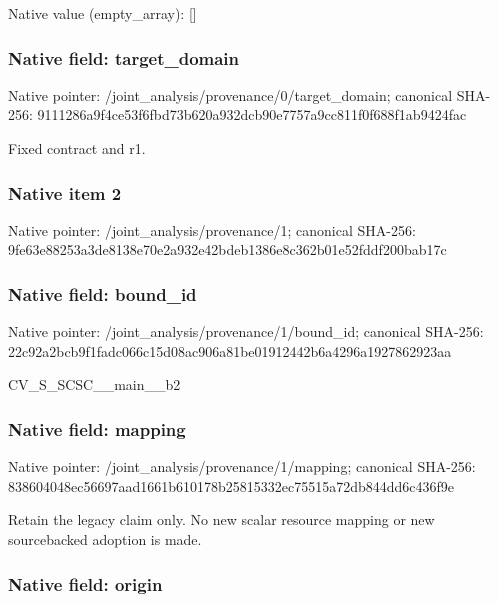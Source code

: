 \documentclass[10pt,a4paper]{article}
\begin{document}
Native value (empty\_array): []



\subsubsection{Native field: target\_domain}


Native pointer: /joint\_analysis/provenan\allowbreak{}ce/0/target\_domain; canonical SHA-256: 9111286a9f4ce53f6fbd73b6\allowbreak{}20a932dcb90e7757a9cc811f\allowbreak{}0f688f1ab9424fac


Fixed contract and r1.


\subsubsection{Native item 2}


Native pointer: /joint\_analysis/provenance/1; canonical SHA-256: 9fe63e88253a3de8138e70e2\allowbreak{}a932e42bdeb1386e8c362b01\allowbreak{}e52fddf200bab17c



\subsubsection{Native field: bound\_id}


Native pointer: /joint\_analysis/provenance/1/bound\_id; canonical SHA-256: 22c92a2bcb9f1fadc066c15d\allowbreak{}08ac906a81be01912442b6a4\allowbreak{}296a1927862923aa


CV\_S\_SCSC\_\_main\_\_b2


\subsubsection{Native field: mapping}


Native pointer: /joint\_analysis/provenance/1/mapping; canonical SHA-256: 838604048ec56697aad1661b\allowbreak{}610178b25815332ec75515a7\allowbreak{}2db844dd6c436f9e


Retain the legacy claim only. No new scalar resource mapping or new sourcebacked adoption is made.


\subsubsection{Native field: origin}
\end{document}
